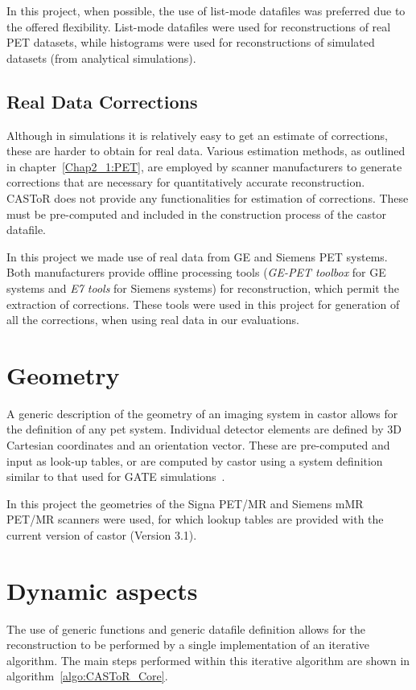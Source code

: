 In this project, when possible, the use of list-mode datafiles was preferred due to the offered flexibility. 
List-mode datafiles were used for reconstructions of real PET datasets, while histograms were used for reconstructions of simulated datasets (from analytical simulations).

\subsection{Real Data Corrections}
Although in simulations it is relatively easy to get an estimate of corrections, these are harder to obtain for real data. Various estimation methods, as outlined in chapter~\ref{Chap2_1:PET}, are employed by scanner manufacturers to generate corrections that are necessary for quantitatively accurate reconstruction.
CASToR does not provide any functionalities for estimation of corrections. These must be pre-computed and included in the construction process of the castor datafile. 

In this project we made use of real data from GE and Siemens PET systems. Both manufacturers provide offline processing tools (\textit{GE-PET toolbox} for GE systems and \textit{E7 tools} for Siemens systems) for reconstruction, which permit the extraction of corrections.
These tools were used in this project for generation of all the corrections, when using real data in our evaluations.

\section{Geometry}
A generic description of the geometry of an imaging system in \gls{castor} allows for the definition of any \gls{pet} system. Individual detector elements are defined by 3D Cartesian coordinates and an orientation vector. These are pre-computed and input as look-up tables, or are computed by \gls{castor} using a system definition similar to that used for GATE simulations~\cite{Jan2011}.

In this project the geometries of the Signa PET/MR and Siemens mMR PET/MR scanners were used, for which lookup tables are provided with the current version of \gls{castor} (Version 3.1). 

\section{Dynamic aspects}

The use of generic functions and generic datafile definition allows for the reconstruction to be performed by a single implementation of an iterative algorithm. The main steps performed within this iterative algorithm are shown in algorithm~\ref{algo:CASToR_Core}. 

